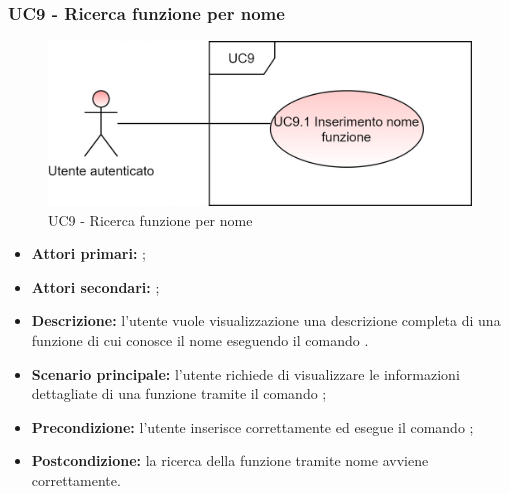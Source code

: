 \subsubsection{UC9 - Ricerca funzione per nome}
\begin{figure}[h]
	\centering
	\includegraphics[scale=\ucs]{./res/img/UC9.png}
	\caption {UC9 - Ricerca funzione per nome}
\end{figure}
\begin{itemize}
	\item \textbf{Attori primari:} \ua{};
	\item \textbf{Attori secondari:} \re{};
	\item \textbf{Descrizione:} l’utente vuole visualizzazione una descrizione completa di una funzione di cui conosce il nome eseguendo il comando \pinfo{}. 
	\item \textbf{Scenario principale:} l'utente richiede di visualizzare le informazioni dettagliate di una funzione tramite il comando \pinfo{};
	\item \textbf{Precondizione:} l'utente inserisce correttamente ed esegue il comando \pinfo{};
	\item \textbf{Postcondizione:} la ricerca della funzione tramite nome avviene correttamente. 
\end{itemize}